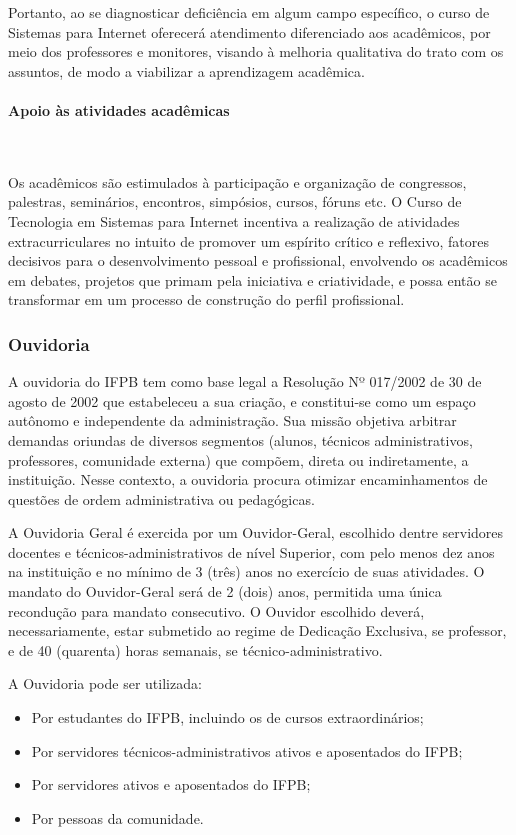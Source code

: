 Portanto, ao se diagnosticar deficiência em algum campo específico, o curso de Sistemas para Internet oferecer\'a atendimento diferenciado aos acadêmicos, por meio dos professores e monitores, visando à melhoria qualitativa do trato com os assuntos, de modo a viabilizar a aprendizagem acadêmica.

\paragraph{Apoio \`as atividades acad\^emicas}\

Os acadêmicos são estimulados \`a participação e organização de congressos, palestras, seminários, encontros, simpósios, cursos, fóruns etc. O Curso de Tecnologia em Sistemas para Internet incentiva a realização de atividades extracurriculares no intuito de promover um espírito crítico e reflexivo, fatores decisivos para o desenvolvimento pessoal e profissional, envolvendo os acadêmicos em debates, projetos que primam pela iniciativa e criatividade, e possa então se transformar em um processo de construção do perfil profissional.

\subsubsection{Ouvidoria}
       
A ouvidoria do IFPB tem como base legal a Resolução Nº 017/2002 de 30 de agosto de 2002 que estabeleceu a sua criação, e constitui-se como um espaço autônomo e independente da administração.  Sua missão objetiva arbitrar demandas oriundas de diversos segmentos (alunos, técnicos administrativos, professores, comunidade externa) que compõem, direta ou indiretamente, a instituição. Nesse contexto, a ouvidoria procura otimizar encaminhamentos de questões de ordem administrativa ou pedagógicas. 

A Ouvidoria Geral é exercida por um Ouvidor-Geral, escolhido dentre servidores docentes e técnicos-administrativos de nível Superior, com pelo menos dez anos na instituição e no mínimo de 3 (três) anos no exercício de suas atividades. O mandato do Ouvidor-Geral será de 2 (dois) anos, permitida uma única recondução para mandato consecutivo. O Ouvidor escolhido deverá, necessariamente, estar submetido ao regime de Dedicação Exclusiva, se professor, e de 40 (quarenta) horas semanais, se técnico-administrativo.

                 A Ouvidoria pode ser utilizada:

\begin{itemize}
\item Por estudantes do IFPB, incluindo os de cursos extraordinários;

\item Por servidores técnicos-administrativos ativos e aposentados do IFPB;

\item Por servidores ativos e aposentados do IFPB;

\item Por pessoas da comunidade.
\end{itemize}

